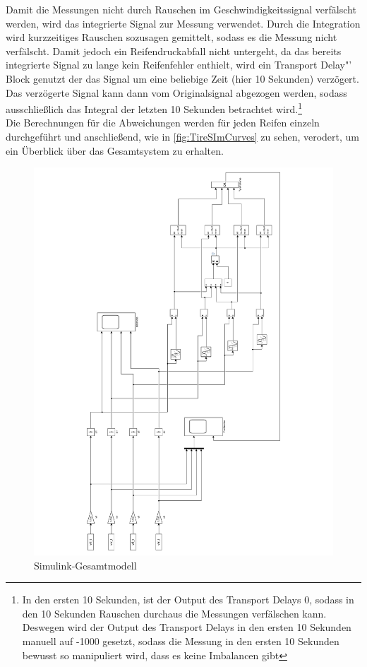 \vspace{-1em}
Damit die Messungen nicht durch Rauschen im Geschwindigkeitssignal verfälscht werden, wird das integrierte Signal zur Messung verwendet. Durch die Integration wird kurzzeitiges Rauschen sozusagen gemittelt, sodass es die Messung nicht verfälscht. Damit jedoch ein Reifendruckabfall nicht untergeht, da das bereits integrierte Signal zu lange kein Reifenfehler enthielt, wird ein  \glqq Transport Delay"' Block genutzt der das Signal um eine beliebige Zeit (hier 10 Sekunden) verzögert. Das verzögerte Signal kann dann vom Originalsignal abgezogen werden, sodass ausschließlich das Integral der letzten 10 Sekunden betrachtet wird.\footnote{In den ersten 10 Sekunden, ist der Output des Transport Delays 0, sodass in den 10 Sekunden Rauschen durchaus die Messungen verfälschen kann. Deswegen wird der Output des Transport Delays in den ersten 10 Sekunden manuell auf -1000 gesetzt, sodass die Messung in den ersten 10 Sekunden bewusst so manipuliert wird, dass es keine Imbalancen gibt }\\
Die Berechnungen für die Abweichungen werden für jeden Reifen einzeln durchgeführt und anschließend, wie in \autoref{fig:TireSImCurves} zu sehen, verodert, um ein Überblick über das Gesamtsystem zu erhalten.\\


\begin{figure}[H]
	\centering
	\includegraphics[height=0.95\textheight]{../Graphiken/TireSimCurvesLandscape.pdf}
	\caption{Simulink-Gesamtmodell}
	\label{fig:TireSImCurves}
\end{figure}

